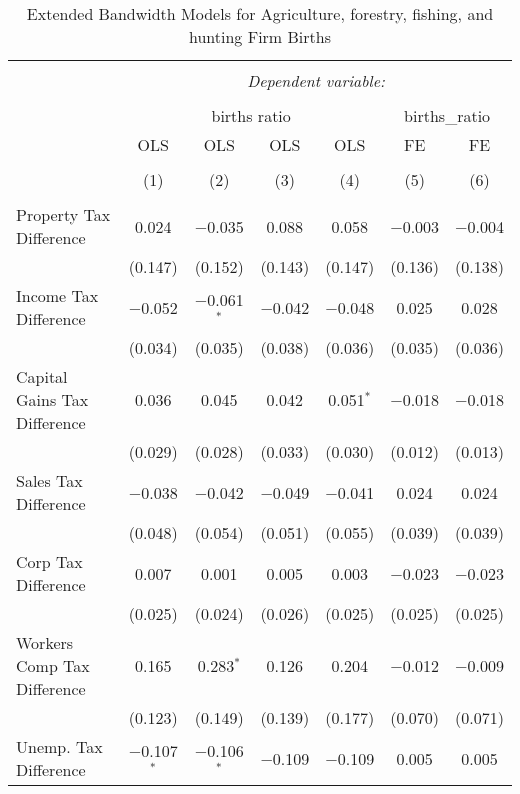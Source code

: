 
\begin{table}[!htbp] \centering 
  \caption{Extended Bandwidth Models for  Agriculture, forestry, fishing, and hunting Firm Births} 
  \label{11eb} 
\begin{tabular}{@{\extracolsep{5pt}}lcccccc} 
\\[-1.8ex]\hline 
\hline \\[-1.8ex] 
 & \multicolumn{6}{c}{\textit{Dependent variable:}} \\ 
\cline{2-7} 
\\[-1.8ex] & \multicolumn{4}{c}{births ratio} & \multicolumn{2}{c}{births\_ratio} \\ 
 & OLS & OLS & OLS & OLS & FE & FE \\ 
\\[-1.8ex] & (1) & (2) & (3) & (4) & (5) & (6)\\ 
\hline \\[-1.8ex] 
 Property Tax Difference & 0.024 & $-$0.035 & 0.088 & 0.058 & $-$0.003 & $-$0.004 \\ 
  & (0.147) & (0.152) & (0.143) & (0.147) & (0.136) & (0.138) \\ 
  Income Tax Difference & $-$0.052 & $-$0.061$^{*}$ & $-$0.042 & $-$0.048 & 0.025 & 0.028 \\ 
  & (0.034) & (0.035) & (0.038) & (0.036) & (0.035) & (0.036) \\ 
  Capital Gains Tax Difference & 0.036 & 0.045 & 0.042 & 0.051$^{*}$ & $-$0.018 & $-$0.018 \\ 
  & (0.029) & (0.028) & (0.033) & (0.030) & (0.012) & (0.013) \\ 
  Sales Tax Difference & $-$0.038 & $-$0.042 & $-$0.049 & $-$0.041 & 0.024 & 0.024 \\ 
  & (0.048) & (0.054) & (0.051) & (0.055) & (0.039) & (0.039) \\ 
  Corp Tax Difference & 0.007 & 0.001 & 0.005 & 0.003 & $-$0.023 & $-$0.023 \\ 
  & (0.025) & (0.024) & (0.026) & (0.025) & (0.025) & (0.025) \\ 
  Workers Comp Tax Difference & 0.165 & 0.283$^{*}$ & 0.126 & 0.204 & $-$0.012 & $-$0.009 \\ 
  & (0.123) & (0.149) & (0.139) & (0.177) & (0.070) & (0.071) \\ 
  Unemp. Tax Difference & $-$0.107$^{*}$ & $-$0.106$^{*}$ & $-$0.109 & $-$0.109 & 0.005 & 0.005 \\ 

\end{tabular}
\end{table}

